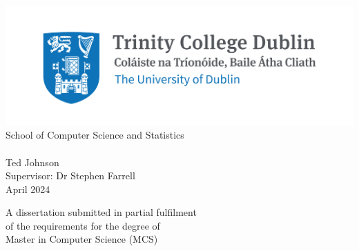 \hypersetup{pageanchor=false}

\begin{titlepage}

\center

\includegraphics{images/trinity_college_dublin.png}\\[1cm]
\Large School of Computer Science and Statistics\\[1.5cm]
\\[1.5cm]
Ted Johnson\\[2cm]
Supervisor: Dr Stephen Farrell\\[2cm]
{\large April 2024}\\[2cm]

\vfill

A dissertation submitted in partial fulfilment\\
of the requirements for the degree of\\
Master in Computer Science (MCS)

\vfill

\end{titlepage}

\hypersetup{pageanchor=true}
